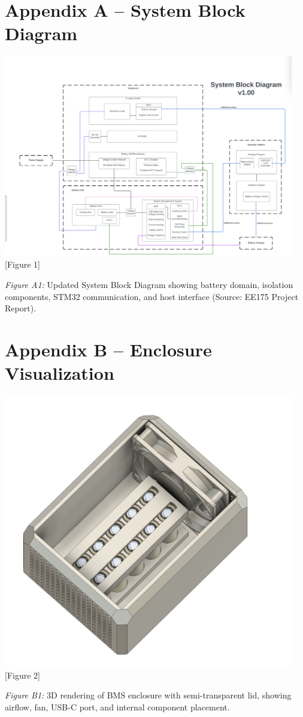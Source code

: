 \documentclass[12pt]{article}
\begin{document}
\vspace{1em}

\section{Appendix A – System Block Diagram}
\begin{center}
    \includegraphics[width=0.95\textwidth]{bms_block_diagram.png} [Figure 1]
\end{center}
\noindent
\textit{Figure A1:} Updated System Block Diagram showing battery domain, isolation components, STM32 communication, and host interface (Source: EE175 Project Report).

\vspace{1em}

\section{Appendix B – Enclosure Visualization}
\begin{center}
    \includegraphics[width=0.95\textwidth]{bms_enclosure_render.png} [Figure 2]
\end{center}
\noindent
\textit{Figure B1:} 3D rendering of BMS enclosure with semi-transparent lid, showing airflow, fan, USB-C port, and internal component placement.

\vspace{1em}
\end{document}
